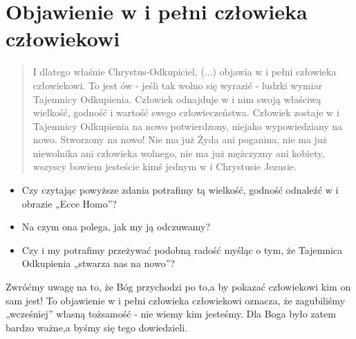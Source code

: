 \documentclass[a5paper,10pt,polish]{book}
\begin{document}
\section{Objawienie  w i pełni człowieka człowiekowi}
\label{babice2006-wiosna-knurow/spotkanie2:objawienie-w-i-pelni-czlowieka-czlowiekowi}\begin{quote}

I dlatego właśnie Chrystus-Odkupiciel, (...)  objawia w i pełni człowieka człowiekowi. To jest ów - jeśli  tak wolno się wyrazić - ludzki wymiar Tajemnicy Odkupienia. Człowiek odnajduje w i nim swoją właściwą wielkość, godność i wartość swego człowieczeństwa. Człowiek zostaje w i Tajemnicy Odkupienia na nowo potwierdzony, niejako wypowiedziany na nowo. Stworzony na nowo! Nie ma już Żyda ani poganina, nie ma już niewolnika ani człowieka wolnego, nie  ma już  mężczyzny ani kobiety, wszyscy bowiem jesteście kimś jednym w i Chrystusie Jezusie.
\end{quote}
\begin{itemize}
\item {} 
Czy czytając powyższe zdania potrafimy tą wielkość,  godność odnaleźć w i obrazie „Ecce Homo”?

\item {} 
Na czym ona polega, jak my ją odczuwamy?

\item {} 
Czy i my potrafimy przeżywać podobną radość myśląc o tym, że Tajemnica Odkupienia „stwarza nas na nowo”?

\end{itemize}

Zwróćmy uwagę na to, że Bóg przychodzi  po to,a by pokazać człowiekowi kim on sam jest! To objawienie w i pełni człowieka człowiekowi oznacza, że zagubiliśmy „wcześniej”  własną tożsamość - nie wiemy kim jesteśmy. Dla Boga było zatem bardzo ważne,a byśmy się tego dowiedzieli.
\end{document}

